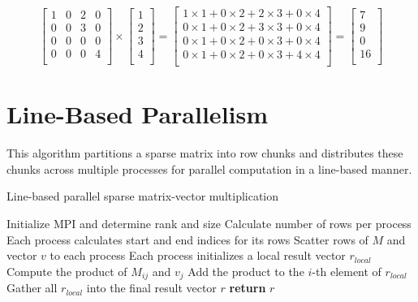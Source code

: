 \documentclass[12pt,oneside]{book} %
\begin{document}
\[
    \begin{bmatrix}
        1 & 0 & 2 & 0 \\
        0 & 0 & 3 & 0 \\
        0 & 0 & 0 & 0 \\
        0 & 0 & 0 & 4 \\
    \end{bmatrix}
    \times
    \begin{bmatrix}
        1 \\
        2 \\
        3 \\
        4 \\
    \end{bmatrix}
    =
    \begin{bmatrix}
        1 \times 1 + 0 \times 2 + 2 \times 3 + 0 \times 4 \\
        0 \times 1 + 0 \times 2 + 3 \times 3 + 0 \times 4 \\
        0 \times 1 + 0 \times 2 + 0 \times 3 + 0 \times 4 \\
        0 \times 1 + 0 \times 2 + 0 \times 3 + 4 \times 4 \\
    \end{bmatrix}
    =
    \begin{bmatrix}
        7  \\
        9  \\
        0  \\
        16 \\
    \end{bmatrix}
\]

\newpage
\section{Line-Based Parallelism}
This algorithm partitions a sparse matrix into row chunks and distributes these
chunks across multiple processes for parallel computation in a line-based
manner.

\begin{algorithm}[H]
    \caption{Line-based parallel sparse matrix-vector multiplication}
    \begin{algorithmic}[1]
        \State Initialize MPI and determine rank and size
        \State Calculate number of rows per process
        \State Each process calculates start and end indices for its rows
        \State Scatter rows of $M$ and vector $v$ to each process
        \State Each process initializes a local result vector $r_{local}$
        \State Compute the product of $M_{ij}$ and $v_j$
        \State Add the product to the $i$-th element of $r_{local}$
        \EndFor
        \EndFor
        \State Gather all $r_{local}$ into the final result vector $r$
        \State \textbf{return} $r$
        \EndProcedure
    \end{algorithmic}
\end{algorithm}
\end{document}
